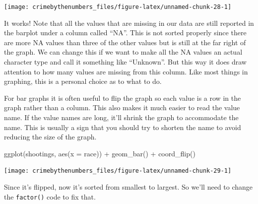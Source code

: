 \documentclass[
]{krantz}
\makeatletter
\newenvironment{Shaded}{\begin{snugshade}}{\end{snugshade}}
\newcommand{\AttributeTok}[1]{\textcolor[rgb]{0.61,0.61,0.61}{#1}}
\newcommand{\ConstantTok}[1]{\textcolor[rgb]{0,0,0}{#1}}
\newcommand{\FunctionTok}[1]{\textcolor[rgb]{0,0,0}{#1}}
\newcommand{\NormalTok}[1]{#1}
\newcommand{\OtherTok}[1]{\textcolor[rgb]{0.37,0.37,0.37}{#1}}
\newcommand{\SpecialCharTok}[1]{\textcolor[rgb]{0,0,0}{#1}}
\newenvironment{kframe}{%
\medskip{}
\setlength{\fboxsep}{.8em}
 \def\at@end@of@kframe{}%
 \ifinner\ifhmode%
  \def\at@end@of@kframe{\end{minipage}}%
  \begin{minipage}{\columnwidth}%
 \fi\fi%
 \def\FrameCommand##1{\hskip\@totalleftmargin \hskip-\fboxsep
 \colorbox{shadecolor}{##1}\hskip-\fboxsep
     \hskip-\linewidth \hskip-\@totalleftmargin \hskip\columnwidth}%
 \MakeFramed {\advance\hsize-\width
   \@totalleftmargin\z@ \linewidth\hsize
   \@setminipage}}%
 {\par\unskip\endMakeFramed%
 \at@end@of@kframe}
\renewenvironment{Shaded}{\begin{kframe}}{\end{kframe}}
\makeatother
\begin{document}
\begin{center}\texttt{[image: crimebythenumbers\_files/figure-latex/unnamed-chunk-28-1]} \end{center}

It works! Note that all the values that are missing in our data are still reported in the barplot under a column called ``NA''. This is not sorted properly since there are more NA values than three of the other values but is still at the far right of the graph. We can change this if we want to make all the NA values an actual character type and call it something like ``Unknown''. But this way it does draw attention to how many values are missing from this column. Like most things in graphing, this is a personal choice as to what to do.

For bar graphs it is often useful to flip the graph so each value is a row in the graph rather than a column. This also makes it much easier to read the value name. If the value names are long, it'll shrink the graph to accommodate the name. This is usually a sign that you should try to shorten the name to avoid reducing the size of the graph.

\begin{Shaded}
\begin{Highlighting}[]
\FunctionTok{ggplot}\NormalTok{(shootings, }\FunctionTok{aes}\NormalTok{(}\AttributeTok{x =}\NormalTok{ race)) }\SpecialCharTok{+} \FunctionTok{geom\_bar}\NormalTok{() }\SpecialCharTok{+} \FunctionTok{coord\_flip}\NormalTok{()}
\end{Highlighting}
\end{Shaded}

\begin{center}\texttt{[image: crimebythenumbers\_files/figure-latex/unnamed-chunk-29-1]} \end{center}

Since it's flipped, now it's sorted from smallest to largest. So we'll need to change the \texttt{factor()} code to fix that.

\begin{Shaded}
\end{Shaded}
\end{document}
